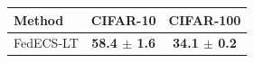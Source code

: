 \begin{tabular}{lcc}
\toprule
Method & CIFAR-10 & CIFAR-100\\
\midrule
FedECS-LT & \textbf{58.4 $\pm$ 1.6} & \textbf{34.1 $\pm$ 0.2}\\
\bottomrule
\end{tabular}
